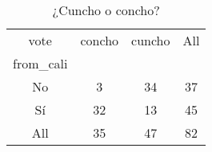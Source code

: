 \begin{table}
\caption{¿Cuncho o concho?}
\label{tab:crosstab1}
\begin{tabular}{|c|c|c|c|}
\toprule
vote & concho & cuncho & All \\
from_cali &  &  &  \\
\midrule
No & 3 & 34 & 37 \\
Sí & 32 & 13 & 45 \\
All & 35 & 47 & 82 \\
\bottomrule
\end{tabular}
\end{table}
